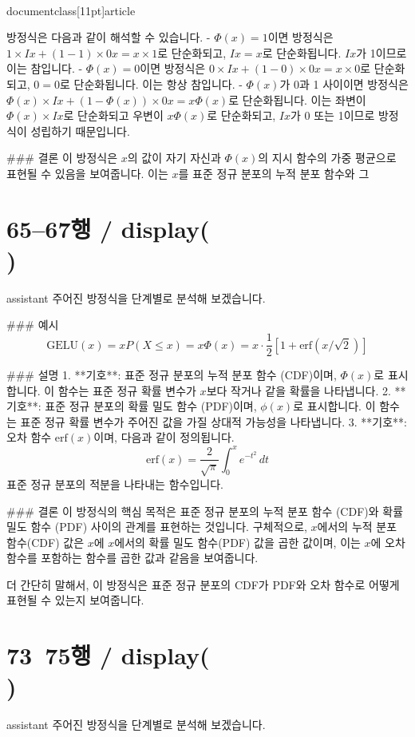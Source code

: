 \\documentclass[11pt]{article}
\begin{document}
방정식은 다음과 같이 해석할 수 있습니다.
- \(\Phi(x) = 1\)이면 방정식은 \(1 \times Ix + (1 - 1) \times 0x = x \times 1\)로 단순화되고, \(Ix = x\)로 단순화됩니다. \(Ix\)가 1이므로 이는 참입니다.
- \(\Phi(x) = 0\)이면 방정식은 \(0 \times Ix + (1 - 0) \times 0x = x \times 0\)로 단순화되고, \(0 = 0\)로 단순화됩니다. 이는 항상 참입니다.
- \(\Phi(x)\)가 0과 1 사이이면 방정식은 \(\Phi(x) \times Ix + (1 - \Phi(x)) \times 0x = x \Phi(x)\)로 단순화됩니다. 이는 좌변이 \(\Phi(x) \times Ix\)로 단순화되고 우변이 \(x \Phi(x)\)로 단순화되고, \(Ix\)가 0 또는 1이므로 방정식이 성립하기 때문입니다.

### 결론
이 방정식은 \(x\)의 값이 자기 자신과 \(\Phi(x)\)의 지시 함수의 가중 평균으로 표현될 수 있음을 보여줍니다. 이는 \(x\)를 표준 정규 분포의 누적 분포 함수와 그

\section*{65–67행 / display(\\[ \\]) }
assistant
주어진 방정식을 단계별로 분석해 보겠습니다.

### 예시
\[
\text{GELU}(x) = xP(X \le x) = x\Phi(x) = x \cdot \frac{1}{2}\left[1 + \text{erf}(x/\sqrt{2})\right]
\]

### 설명
1. **기호**: 표준 정규 분포의 누적 분포 함수 (CDF)이며, \(\Phi(x)\)로 표시합니다. 이 함수는 표준 정규 확률 변수가 \(x\)보다 작거나 같을 확률을 나타냅니다.
2. **기호**: 표준 정규 분포의 확률 밀도 함수 (PDF)이며, \(\phi(x)\)로 표시합니다. 이 함수는 표준 정규 확률 변수가 주어진 값을 가질 상대적 가능성을 나타냅니다.
3. **기호**: 오차 함수 \(\text{erf}(x)\)이며, 다음과 같이 정의됩니다.
\[
   \text{erf}(x) = \frac{2}{\sqrt{\pi}} \int_0^x e^{-t^2} \, dt
   \]
표준 정규 분포의 적분을 나타내는 함수입니다.

### 결론
이 방정식의 핵심 목적은 표준 정규 분포의 누적 분포 함수 (CDF)와 확률 밀도 함수 (PDF) 사이의 관계를 표현하는 것입니다. 구체적으로, \(x\)에서의 누적 분포 함수(CDF) 값은 \(x\)에 \(x\)에서의 확률 밀도 함수(PDF) 값을 곱한 값이며, 이는 \(x\)에 오차 함수를 포함하는 함수를 곱한 값과 같음을 보여줍니다.

더 간단히 말해서, 이 방정식은 표준 정규 분포의 CDF가 PDF와 오차 함수로 어떻게 표현될 수 있는지 보여줍니다.


\section*{73~75행 / display(\\[ \\]) }
assistant
주어진 방정식을 단계별로 분석해 보겠습니다.
\end{document}
